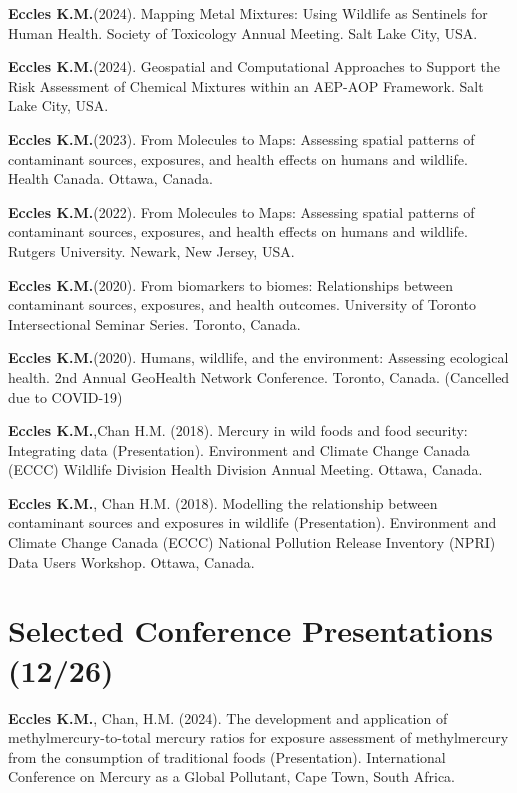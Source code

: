 \documentclass[margin,line]{res}
\begin{document}
\begin{resume}
\textbf{Eccles K.M.}(2024). Mapping Metal Mixtures: Using Wildlife as Sentinels for Human Health. Society of Toxicology Annual Meeting. Salt Lake City, USA.

\textbf{Eccles K.M.}(2024). Geospatial and Computational Approaches to Support the Risk Assessment of Chemical Mixtures within an AEP-AOP Framework. Salt Lake City, USA.

\textbf{Eccles K.M.}(2023). From Molecules to Maps: Assessing spatial patterns of contaminant sources, exposures, and health effects on humans and wildlife. Health Canada. Ottawa, Canada.

\textbf{Eccles K.M.}(2022). From Molecules to Maps: Assessing spatial patterns of contaminant sources, exposures, and health effects on humans and wildlife. Rutgers University. Newark, New Jersey, USA.

\textbf{Eccles K.M.}(2020). From biomarkers to biomes: Relationships between contaminant sources, exposures, and health outcomes. University of Toronto Intersectional Seminar Series. Toronto, Canada.

\textbf{Eccles K.M.}(2020). Humans, wildlife, and the environment: Assessing ecological health. 2nd Annual GeoHealth Network Conference. Toronto, Canada. (Cancelled due to COVID-19)

\textbf{Eccles K.M.},Chan H.M. (2018). Mercury in wild foods and food security: Integrating data (Presentation). Environment and Climate Change Canada (ECCC) Wildlife Division Health Division Annual Meeting. Ottawa, Canada.

\textbf{Eccles K.M.}, Chan H.M. (2018). Modelling the relationship between contaminant sources and exposures in wildlife (Presentation). Environment and Climate Change Canada (ECCC) National Pollution Release Inventory (NPRI) Data Users Workshop. Ottawa, Canada.

\vspace*{.1in}
\section{\sc Selected Conference Presentations (12/26)}

\textbf{Eccles K.M.}, Chan, H.M. (2024). The development and application of methylmercury-to-total mercury ratios for exposure assessment of methylmercury from the consumption of traditional foods (Presentation). International Conference on Mercury as a Global Pollutant, Cape Town, South Africa.


\end{resume}
\end{document}
